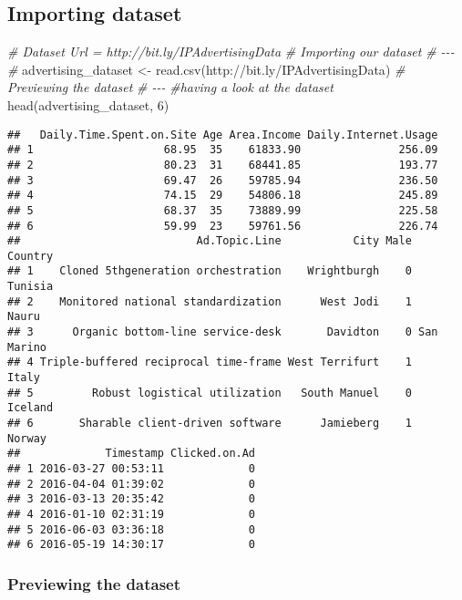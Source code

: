 \documentclass[
]{article}
\newenvironment{Shaded}{\begin{snugshade}}{\end{snugshade}}
\newcommand{\CommentTok}[1]{\textcolor[rgb]{0.56,0.35,0.01}{\textit{#1}}}
\newcommand{\DecValTok}[1]{\textcolor[rgb]{0.00,0.00,0.81}{#1}}
\newcommand{\FunctionTok}[1]{\textcolor[rgb]{0.00,0.00,0.00}{#1}}
\newcommand{\NormalTok}[1]{#1}
\newcommand{\OtherTok}[1]{\textcolor[rgb]{0.56,0.35,0.01}{#1}}
\newcommand{\StringTok}[1]{\textcolor[rgb]{0.31,0.60,0.02}{#1}}
\begin{document}
\hypertarget{importing-dataset}{%
\subsection{Importing dataset}\label{importing-dataset}}

\begin{Shaded}
\begin{Highlighting}[]
\CommentTok{\# Dataset Url = http://bit.ly/IPAdvertisingData}
\CommentTok{\# Importing our dataset}
\CommentTok{\# {-}{-}{-}}
\CommentTok{\#}
\NormalTok{advertising\_dataset }\OtherTok{\textless{}{-}} \FunctionTok{read.csv}\NormalTok{(}\StringTok{\textquotesingle{}http://bit.ly/IPAdvertisingData\textquotesingle{}}\NormalTok{)}
\CommentTok{\# Previewing the dataset}
\CommentTok{\# {-}{-}{-}}
\CommentTok{\#having a look at the dataset }
\FunctionTok{head}\NormalTok{(advertising\_dataset, }\DecValTok{6}\NormalTok{)}
\end{Highlighting}
\end{Shaded}

\begin{verbatim}
##   Daily.Time.Spent.on.Site Age Area.Income Daily.Internet.Usage
## 1                    68.95  35    61833.90               256.09
## 2                    80.23  31    68441.85               193.77
## 3                    69.47  26    59785.94               236.50
## 4                    74.15  29    54806.18               245.89
## 5                    68.37  35    73889.99               225.58
## 6                    59.99  23    59761.56               226.74
##                           Ad.Topic.Line           City Male    Country
## 1    Cloned 5thgeneration orchestration    Wrightburgh    0    Tunisia
## 2    Monitored national standardization      West Jodi    1      Nauru
## 3      Organic bottom-line service-desk       Davidton    0 San Marino
## 4 Triple-buffered reciprocal time-frame West Terrifurt    1      Italy
## 5         Robust logistical utilization   South Manuel    0    Iceland
## 6       Sharable client-driven software      Jamieberg    1     Norway
##             Timestamp Clicked.on.Ad
## 1 2016-03-27 00:53:11             0
## 2 2016-04-04 01:39:02             0
## 3 2016-03-13 20:35:42             0
## 4 2016-01-10 02:31:19             0
## 5 2016-06-03 03:36:18             0
## 6 2016-05-19 14:30:17             0
\end{verbatim}

\hypertarget{previewing-the-dataset}{%
\subsubsection{Previewing the dataset}\label{previewing-the-dataset}}
\end{document}
